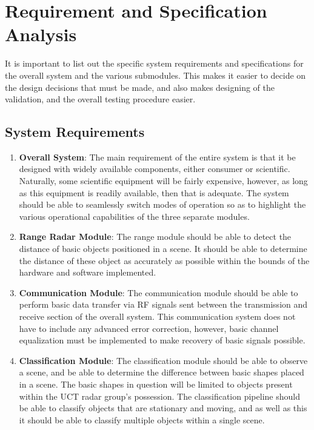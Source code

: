 \documentclass[11pt]{report}
\begin{document}
\section{Requirement and Specification Analysis}\label{sec:requirements_specifications}
It is important to list out the specific system requirements and specifications for the overall system and the various submodules. This makes it easier to decide on the design decisions that must be made, and also makes designing of the validation, and the overall testing procedure easier.

\subsection{System Requirements}

\begin{enumerate}
    \item \textbf{Overall System}: The main requirement of the entire system is that it be designed with widely available components, either consumer or scientific. Naturally, some scientific equipment will be fairly expensive, however, as long as this equipment is readily available, then that is adequate. The system should be able to seamlessly switch modes of operation so as to highlight the various operational capabilities of the three separate modules. 
    \item \textbf{Range Radar Module}: The range module should be able to detect the distance of basic objects positioned in a scene. It should be able to determine the distance of these object as accurately as possible within the bounds of the hardware and software implemented.
    \item \textbf{Communication Module}: The communication module should be able to perform basic data transfer via RF signals sent between the transmission and receive section of the overall system. This communication system does not have to include any advanced error correction, however, basic channel equalization must be implemented to make recovery of basic signals possible.
    \item \textbf{Classification Module}: The classification module should be able to observe a scene, and be able to determine the difference between basic shapes placed in a scene. The basic shapes in question will be limited to objects present within the UCT radar group's possession. The classification pipeline should be able to classify objects that are stationary and moving, and as well as this it should be able to classify multiple objects within a single scene.
\end{enumerate}
\end{document}
